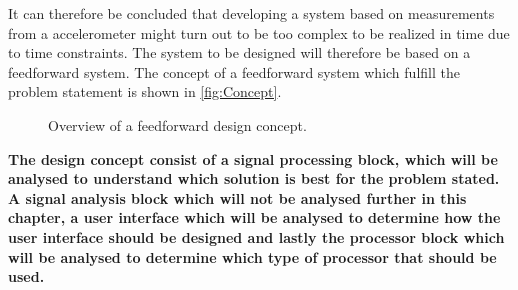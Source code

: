 It can therefore be concluded that developing a system based on measurements from a accelerometer might turn out to be too complex to be realized in time due to time constraints. The system to be designed will therefore be based on a feedforward system. The concept of a feedforward system which fulfill the problem statement is shown in \autoref{fig:Concept}.

\begin{figure}[H]
\centering
{}
\scalebox{0.8}{
}
\caption{Overview of a feedforward design concept.}
\label{fig:Concept}
\end{figure}


\textbf{The design concept consist of a signal processing block, which will be analysed to understand which solution is best for the problem stated. A signal analysis block which will not be analysed further in this chapter, a user interface which will be analysed to determine how the user interface should be designed and lastly the processor block which will be analysed to determine which type of processor that should be used.}
